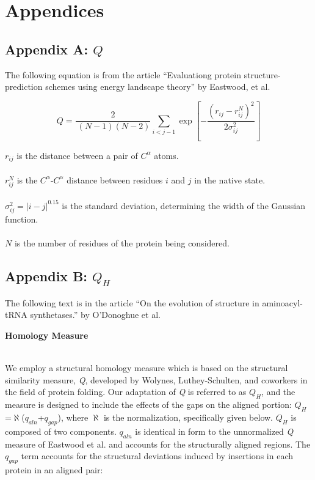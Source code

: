 \label{unit10}


\section{Appendices}
\subsection{Appendix A: $Q$}
The following equation is from the article ``Evaluationg protein
structure-prediction schemes using energy landscape theory'' by
Eastwood, et al.

\[
Q=\frac{2}{\ (N-1)(N-2)} \sum _{i<j-1}\exp \left[ -\frac{\left( r_{ij}-r^{N}_{ij}
\right)^{2}}{2\sigma ^{2}_{ij}}\right] 
\]

\noindent
$r_{ij}$ is the distance between a pair of $C^{\alpha}$ atoms.\\
~\\
$r_{ij}^N$ is the $C^{\alpha}$-$C^{\alpha}$ distance between residues 
$i$ 
and $j$ in the native state.\\
~\\
$\sigma ^{2}_{ij}=\left| i-j\right| ^{0.15}$ is the standard deviation, determining the width of the Gaussian function.\\
~\\
$N$ is the number of residues of the protein being considered.


\newpage
\subsection{Appendix B: $Q_H$}
The following text is in the article ``On the evolution of structure in 
aminoacyl-tRNA synthetases.''
by O'Donoghue et al.\\

\begin{center}
{\bfseries Homology Measure}
\end{center}
~\\
We employ a structural homology measure which is based on the structural
similarity measure, {\it Q}, developed by Wolynes, Luthey-Schulten, and
coworkers  in the field of protein folding. Our adaptation of {\it Q} is
referred to as $Q_H$, and the measure is designed to include the effects
of the gaps on the aligned portion: $Q_H$=$\aleph$($q_{aln}$+$q_{gap}$),
where $\aleph$ is the normalization, specifically given below.  $Q_H$ is
composed of two components. $q_{aln}$ is identical in form to the
unnormalized {\it Q} measure of Eastwood et al. and accounts for the
structurally aligned regions. The $q_{gap}$ term accounts for the
structural deviations induced by insertions in each protein in an
aligned pair: 
 
